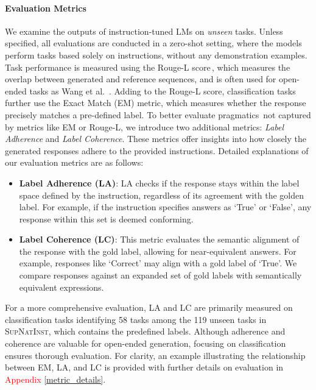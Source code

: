 \paragraph{Evaluation Metrics} We examine the outputs of instruction-tuned LMs on \textit{unseen} tasks. Unless specified, all evaluations are conducted in a zero-shot setting, where the models perform tasks based solely on instructions, without any demonstration examples. Task performance is measured using the Rouge-L score\,\citep{rouge}, which measures the overlap between generated and reference sequences, and is often used for open-ended tasks as Wang et al. \,\citep{sni_dataset}. Adding to the Rouge-L score, classification tasks further use the Exact Match (EM) metric, which measures whether the response precisely matches a pre-defined label. 
To better evaluate pragmatics\,\citep{pragmatics} not captured by metrics like EM or Rouge-L, we introduce two additional metrics: \textit{Label Adherence} and \textit{Label Coherence}. These metrics offer insights into how closely the generated responses adhere to the provided instructions. Detailed explanations of our evaluation metrics are as follows:
%
\begin{itemize}[left=10pt]
    \item \textbf{Label Adherence (LA)}: LA checks if the response stays within the label space defined by the instruction, regardless of its agreement with the golden label. For example, if the instruction specifies answers as `True' or `False', any response within this set is deemed conforming.
    \item \textbf{Label Coherence (LC)}: This metric evaluates the semantic alignment of the response with the gold label, allowing for near-equivalent answers. For example, responses like `Correct' may align with a gold label of `True'. We compare responses against an expanded set of gold labels with semantically equivalent expressions.
\end{itemize}

For a more comprehensive evaluation, LA and LC are primarily measured on classification tasks identifying 58 tasks among the 119 unseen tasks in \textsc{SupNatInst}, which contains the predefined labels. Although adherence and coherence are valuable for open-ended generation, focusing on classification ensures thorough evaluation. For clarity, an example illustrating the relationship between EM, LA, and LC is provided with further details on evaluation in \textcolor{red}{Appendix} \ref{metric_details}.

